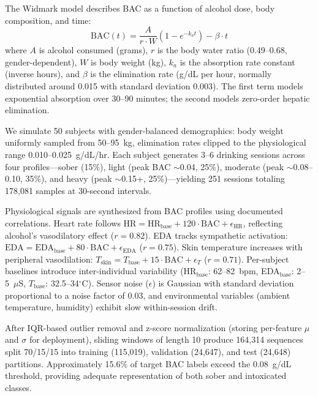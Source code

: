 \documentclass[HARVARD,Times2COL]{WileyNJDv5}
\begin{document}
The Widmark model describes BAC as a function of alcohol dose, body composition, and time:
\begin{equation}
\text{BAC}(t) = \frac{A}{r \cdot W} \left(1 - e^{-k_a t}\right) - \beta \cdot t
\end{equation}
where $A$ is alcohol consumed (grams), $r$ is the body water ratio (0.49--0.68, gender-dependent), $W$ is body weight (kg), $k_a$ is the absorption rate constant (inverse hours), and $\beta$ is the elimination rate (g/dL per hour, normally distributed around 0.015 with standard deviation 0.003). The first term models exponential absorption over 30--90 minutes; the second models zero-order hepatic elimination.

We simulate 50 subjects with gender-balanced demographics: body weight uniformly sampled from 50--95~kg, elimination rates clipped to the physiological range 0.010--0.025~g/dL/hr. Each subject generates 3--6 drinking sessions across four profiles---sober (15\%), light (peak BAC $\sim$0.04, 25\%), moderate (peak $\sim$0.08--0.10, 35\%), and heavy (peak $\sim$0.15+, 25\%)---yielding 251 sessions totaling 178,081 samples at 30-second intervals.

Physiological signals are synthesized from BAC profiles using documented correlations. Heart rate follows $\text{HR} = \text{HR}_{\text{base}} + 120 \cdot \text{BAC} + \epsilon_{\text{HR}}$, reflecting alcohol's vasodilatory effect ($r = 0.82$). EDA tracks sympathetic activation: $\text{EDA} = \text{EDA}_{\text{base}} + 80 \cdot \text{BAC} + \epsilon_{\text{EDA}}$ ($r = 0.75$). Skin temperature increases with peripheral vasodilation: $T_{\text{skin}} = T_{\text{base}} + 15 \cdot \text{BAC} + \epsilon_T$ ($r = 0.71$). Per-subject baselines introduce inter-individual variability (HR$_{\text{base}}$: 62--82~bpm, EDA$_{\text{base}}$: 2--5~$\mu$S, $T_{\text{base}}$: 32.5--34$^\circ$C). Sensor noise ($\epsilon$) is Gaussian with standard deviation proportional to a noise factor of 0.03, and environmental variables (ambient temperature, humidity) exhibit slow within-session drift.

After IQR-based outlier removal and z-score normalization (storing per-feature $\mu$ and $\sigma$ for deployment), sliding windows of length 10 produce 164,314 sequences split 70/15/15 into training (115,019), validation (24,647), and test (24,648) partitions. Approximately 15.6\% of target BAC labels exceed the 0.08~g/dL threshold, providing adequate representation of both sober and intoxicated classes.
\end{document}
